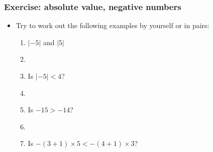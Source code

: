 \documentclass[11pt,dvipsnames]{beamer}
\newcommand{\myframe}[1]{\begin{frame} \frametitle{#1}}
\begin{document}
\myframe{Exercise: absolute value, negative numbers}
\begin{itemize}
\item Try to work out the following examples by yourself or in pairs:
\begin{enumerate}
\item $|-5|$ and $|5|$
\item[]
\item Is $|-5| < 4$?
\item[]
\item Is $-15 > -14$? 
\item[]
\item Is $-(3 + 1)\times 5 < -(4 + 1)\times 3$?
\end{enumerate}
\end{itemize}
\end{frame}

\end{document}
